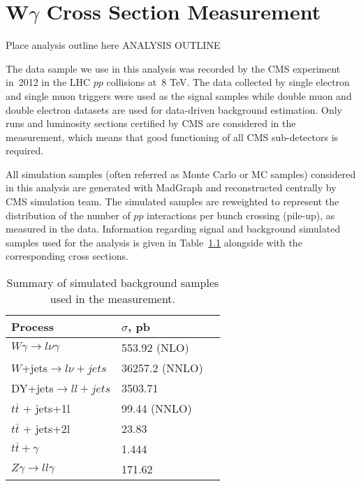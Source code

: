 \chapter{W$\gamma$ Cross Section Measurement}
\label{sec:AN_WgMeas}
Place analysis outline here
ANALYSIS OUTLINE

The data sample we use in this analysis was recorded by the CMS experiment in~2012 in the LHC $pp$ collisions at~8 TeV. The data collected by single electron and single muon triggers were used as the signal samples while double muon and double electron datasets are used for data-driven background estimation. Only runs and luminosity sections certified by CMS are considered in the measurement, which means that good functioning of all CMS sub-detectors is required.

All simulation samples (often referred as Monte Carlo or MC samples) considered in this analysis are generated with MadGraph and reconstructed centrally by CMS simulation team. The simulated samples are reweighted to represent the distribution of the number of $pp$ interactions per bunch crossing (pile-up), as measured in the data. Information regarding signal and background simulated samples used for the analysis is given in Table~\ref{tab:mc_bkg_samples} alongside with the corresponding cross sections. 

\begin{table}[h]
  \scriptsize
  \begin{center}
    \caption{Summary of simulated background samples used in the measurement.}
    \begin{tabular}{|l|l|l|}
      \hline
      Process                      & $\sigma$, pb         \\ \hline
      $W\gamma \rightarrow l\nu\gamma$     & 553.92 (NLO)    \\
      $W$+jets$ \rightarrow l\nu + jets$          & 36257.2 (NNLO)  \\ 
      DY+jets$ \rightarrow ll + jets$            & 3503.71         \\
      $t\bar{t}$ + jets+1l                    & 99.44 (NNLO)   \\
      $t\bar{t}$ + jets+2l                    & 23.83         \\
      $t\bar{t} + \gamma$                    & 1.444          \\
      $Z\gamma \rightarrow ll\gamma$       & 171.62           \\
      \hline
    \end{tabular}
    \label{tab:mc_bkg_samples}
  \end{center}
\end{table} 

